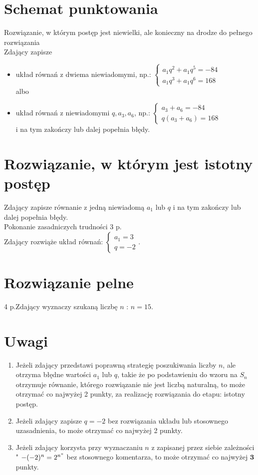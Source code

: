 \documentclass[10pt]{article}
\begin{document}
\section*{Schemat punktowania}
Rozwiązanie, w którym postęp jest niewielki, ale konieczny na drodze do pełnego rozwiązania\\
Zdający zapisze

\begin{itemize}
  \item układ równań z dwiema niewiadomymi, np.: $\left\{\begin{array}{l}a_{1} q^{2}+a_{1} q^{5}=-84 \\ a_{1} q^{3}+a_{1} q^{6}=168\end{array}\right.$\\
albo
  \item układ równań z niewiadomymi $q, a_{3}, a_{6}$, np.: $\left\{\begin{array}{l}a_{3}+a_{6}=-84 \\ q\left(a_{3}+a_{6}\right)=168\end{array}\right.$\\
i na tym zakończy lub dalej popełnia błędy.
\end{itemize}

\section*{Rozwiązanie, w którym jest istotny postęp}
Zdający zapisze równanie z jedną niewiadomą $a_{1}$ lub $q$ i na tym zakończy lub dalej popełnia błędy.\\
Pokonanie zasadniczych trudności 3 p.\\
Zdający rozwiąże układ równań: $\left\{\begin{array}{l}a_{1}=3 \\ q=-2\end{array}\right.$.

\section*{Rozwiązanie pelne}
 4 p.Zdający wyznaczy szukaną liczbę $n$ : $n=15$.

\section*{Uwagi}
\begin{enumerate}
  \item Jeżeli zdający przedstawi poprawną strategię poszukiwania liczby $n$, ale otrzyma błędne wartości $a_{1}$ lub $q$, takie że po podstawieniu do wzoru na $S_{n}$ otrzymuje równanie, którego rozwiązanie nie jest liczbą naturalną, to może otrzymać co najwyżej 2 punkty, za realizację rozwiązania do etapu: istotny postęp.
  \item Jeżeli zdający zapisze $q=-2$ bez rozwiązania układu lub stosownego uzasadnienia, to może otrzymać co najwyżej 2 punkty.
  \item Jeżeli zdający korzysta przy wyznaczaniu $n$ z zapisanej przez siebie zależności " $-(-2)^{n}=2^{n "}$ bez stosownego komentarza, to może otrzymać co najwyżej $\mathbf{3}$ punkty.
\end{enumerate}
\end{document}
